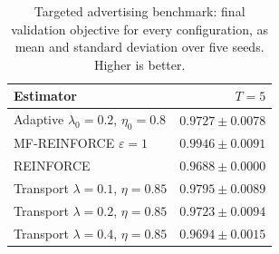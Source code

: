 \begin{table}[H]
\centering
\begin{tabular}{lr}
\toprule
Estimator & $T=5$ \\
\midrule
Adaptive $\lambda_0=0.2$, $\eta_0=0.8$ & $0.9727\pm0.0078$ \\
MF-REINFORCE $\varepsilon=1$ & $0.9946\pm0.0091$ \\
REINFORCE & $0.9688\pm0.0000$ \\
Transport $\lambda=0.1$, $\eta=0.85$ & $0.9795\pm0.0089$ \\
Transport $\lambda=0.2$, $\eta=0.85$ & $0.9723\pm0.0094$ \\
Transport $\lambda=0.4$, $\eta=0.85$ & $0.9694\pm0.0015$ \\
\bottomrule
\end{tabular}
\caption{Targeted advertising benchmark: final validation objective for every configuration, as mean and standard deviation over five seeds. Higher is better.}
\label{tab:full-objectives-advertising}
\end{table}
